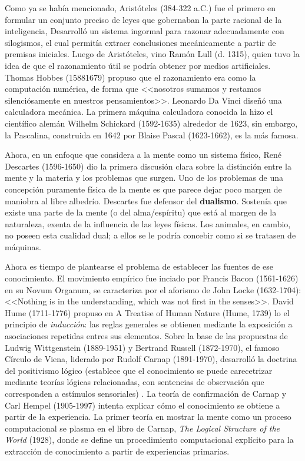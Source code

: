 \documentclass{article}
\begin{document}
Como ya se había mencionado, Aristóteles (384-322 a.C.)  fue el primero en formular un conjunto preciso de leyes que gobernaban la parte racional de la inteligencia, Desarrolló un sistema ingormal para razonar adecuadamente con silogismos, el cual permitía extraer conclusiones mecánicamente a partir de premisas iniciales. Luego de Aristóteles, vino Ramón Lull (d. 1315), quien tuvo la idea de que el razonamiento útil se podría obtener por medios artificiales.  Thomas Hobbes (15881679) propuso que el razonamiento era como la computación numérica, de forma que <<nosotros sumamos y restamos silenciósamente en nuestros pensamientos>>. Leonardo Da Vinci diseñó una calculadora mecánica. La primera máquina calculadora conocida la hizo el científico alemán Wilhelm Schickard (1592-1635) alrededor de 1623, sin embargo, la Pascalina, construida en 1642 por Blaise Pascal (1623-1662), es la más famosa.

Ahora, en un enfoque que considera a la mente como un sistema físico,  René Descartes (1596-1650) dio la primera discusión clara sobre la distinción entre la mente y la materia y los problemas que surgen. Uno de los problemas de una concepción puramente física de la mente es que parece dejar poco margen de maniobra al libre albedrío. Descartes fue defensor del \textbf{dualismo}. Sostenía que existe una parte de la mente (o del alma/espíritu) que está al margen de la naturaleza, exenta de la influencia de las leyes físicas. Los animales, en cambio, no poseen esta cualidad dual; a ellos se le podría concebir como si se tratasen de máquinas.

Ahora es tiempo de plantearse el problema de establecer las fuentes de ese conocimiento. El movimiento empírico fue inciado por Francis Bacon (1561-1626) en su Novum Organum, se caracteriza por el aforismo de John Locke (1632-1704): <<Nothing is in the understanding, which was not first in the senses>>.  David Hume (1711-1776) propuso en A Treatise of Human Nature (Hume, 1739) lo el principio de \textit{inducción}: las reglas generales se obtienen mediante la exposición a asociaciones repetidas entres sus elementos. Sobre la base de las propuestas de Ludwig Wittgenstein (1889-1951) y Bertrand Russell (1872-1970), el famoso Círculo de Viena, liderado por Rudolf Carnap (1891-1970), desarrolló la doctrina del positivismo lógico (establece que el conocimiento se puede carecetrizar mediante teorías lógicas relacionadas, con sentencias de observación que corresponden a estímulos sensoriales) . La teoría de confirmación de Carnap y Carl Hempel (1905-1997) intenta explicar cómo el conocimiento se obtiene a partir de la experiencia. La primer teoría en mostrar la mente como un proceso computacional se plasma en el libro de Carnap, \textit{The Logical Structure of the World} (1928), donde se define un procedimiento computacional explícito para la extracción de conocimiento a partir de experiencias primarias.
\end{document}
